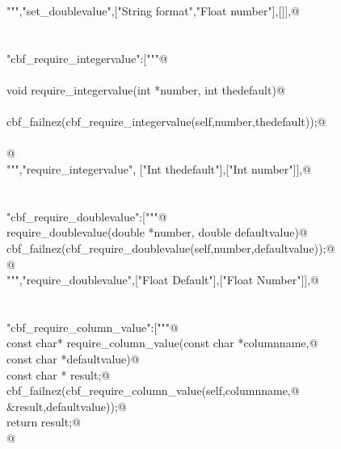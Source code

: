\documentclass[10pt,a4paper,twoside,notitlepage]{article}
\begin{document}
\begin{flushleft}
\begin{list}{}{}
\mbox{}\verb@""","set_doublevalue",["String format","Float number"],[]],@\\
\mbox{}\verb@@\\
\mbox{}\verb@@\\
\mbox{}\verb@"cbf_require_integervalue":["""@\\
\mbox{}\verb@%apply int *OUTPUT {int *number} require_integervalue;@\\
\mbox{}\verb@@\\
\mbox{}\verb@     void require_integervalue(int *number, int thedefault){@\\
\mbox{}\verb@@\\
\mbox{}\verb@     cbf_failnez(cbf_require_integervalue(self,number,thedefault));@\\
\mbox{}\verb@@\\
\mbox{}\verb@     }@\\
\mbox{}\verb@""","require_integervalue", ["Int thedefault"],["Int number"]],@\\
\mbox{}\verb@@\\
\mbox{}\verb@@\\
\mbox{}\verb@"cbf_require_doublevalue":["""@\\
\mbox{}\verb@%apply double *OUTPUT {double *number} require_doublevalue;@\\
\mbox{}\verb@void require_doublevalue(double *number, double defaultvalue){@\\
\mbox{}\verb@   cbf_failnez(cbf_require_doublevalue(self,number,defaultvalue));@\\
\mbox{}\verb@}@\\
\mbox{}\verb@""","require_doublevalue",["Float Default"],["Float Number"]],@\\
\mbox{}\verb@@\\
\mbox{}\verb@@\\
\mbox{}\verb@"cbf_require_column_value":["""@\\
\mbox{}\verb@ const char* require_column_value(const char *columnname,@\\
\mbox{}\verb@                                  const char *defaultvalue){@\\
\mbox{}\verb@   const char * result;@\\
\mbox{}\verb@   cbf_failnez(cbf_require_column_value(self,columnname,@\\
\mbox{}\verb@                                    &result,defaultvalue));@\\
\mbox{}\verb@   return result;@\\
\mbox{}\verb@}@\\

\end{list}
\end{flushleft}
\end{document}
